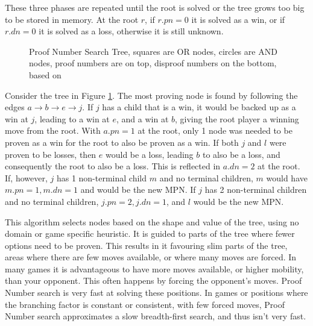 These three phases are repeated until the root is solved or the tree grows too big to be stored in memory. At the root $r$, if $r.pn = 0$ it is solved as a win, or if $r.dn = 0$ it is solved as a loss, otherwise it is still unknown.

\begin{figure}
\centering
{}
\caption[Proof Number Search Tree]{Proof Number Search Tree, squares are OR nodes, circles are AND nodes, proof numbers are on top, disproof numbers on the bottom, based on \cite{winands2003-PDS-PN}}
\label{fig:pntree}
\end{figure}

Consider the tree in Figure \ref{fig:pntree}. The most proving node is found by following the edges $a \rightarrow b \rightarrow e \rightarrow j$. If $j$ has a child that is a win, it would be backed up as a win at $j$, leading to a win at $e$, and a win at $b$, giving the root player a winning move from the root. With $a.pn = 1$ at the root, only 1 node was needed to be proven as a win for the root to also be proven as a win. If both $j$ and $l$ were proven to be losses, then $e$ would be a loss, leading $b$ to also be a loss, and consequently the root to also be a loss. This is reflected in $a.dn = 2$ at the root. If, however, $j$ has 1 non-terminal child $m$ and no terminal children, $m$ would have $m.pn = 1, m.dn = 1$ and would be the new MPN. If $j$ has 2 non-terminal children and no terminal children, $j.pn = 2, j.dn = 1$, and $l$ would be the new MPN.

This algorithm selects nodes based on the shape and value of the tree, using no domain or game specific heuristic. It is guided to parts of the tree where fewer options need to be proven. This results in it favouring slim parts of the tree, areas where there are few moves available, or where many moves are forced. In many games it is advantageous to have more moves available, or higher mobility, than your opponent. This often happens by forcing the opponent's moves. Proof Number search is very fast at solving these positions. In games or positions where the branching factor is constant or consistent, with few forced moves, Proof Number search approximates a slow breadth-first search, and thus isn't very fast.

